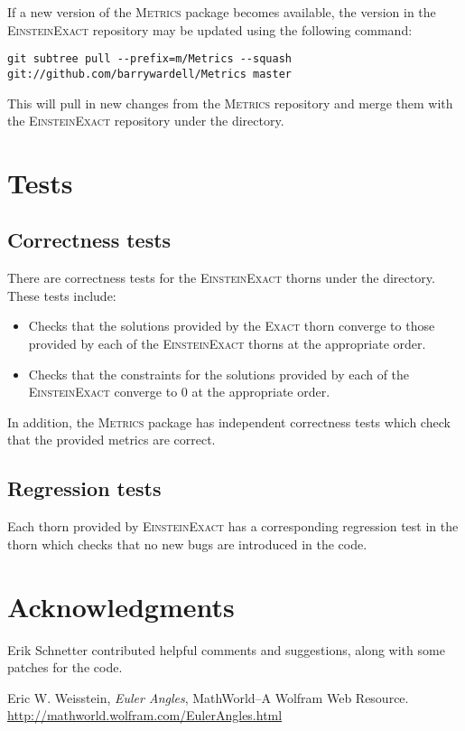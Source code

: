 \documentclass{article}
\begin{document}
If a new version of the \textsc{Metrics} package becomes available, the version
in the \textsc{EinsteinExact} repository may be updated using the following
command:
\begin{verbatim}
git subtree pull --prefix=m/Metrics --squash git://github.com/barrywardell/Metrics master
\end{verbatim}
This will pull in new changes from the \textsc{Metrics} repository and merge
them with the \textsc{EinsteinExact} repository under the 
directory.

\section{Tests}

\subsection{Correctness tests}
There are correctness tests for the \textsc{EinsteinExact} thorns under the
 directory. These tests include:
\begin{itemize}
\item Checks that the solutions provided by the \textsc{Exact} thorn converge
  to those provided by each of the \textsc{EinsteinExact} thorns at the appropriate order.
\item Checks that the constraints for the solutions provided by each of the
 \textsc{EinsteinExact} converge to $0$ at the appropriate order.
\end{itemize}
In addition, the \textsc{Metrics} package has independent correctness tests
which check that the provided metrics are correct.

\subsection{Regression tests}
Each thorn provided by \textsc{EinsteinExact} has a corresponding regression
test in the  thorn which checks that no new bugs are
introduced in the code.

\section{Acknowledgments}
Erik Schnetter contributed helpful comments and suggestions, along with some
patches for the code.

\begin{thebibliography}{{Pen}}

{Eric W. Weisstein, {\em Euler Angles}, MathWorld--A Wolfram Web Resource. \url{http://mathworld.wolfram.com/EulerAngles.html}}

\end{thebibliography}

\end{document}
